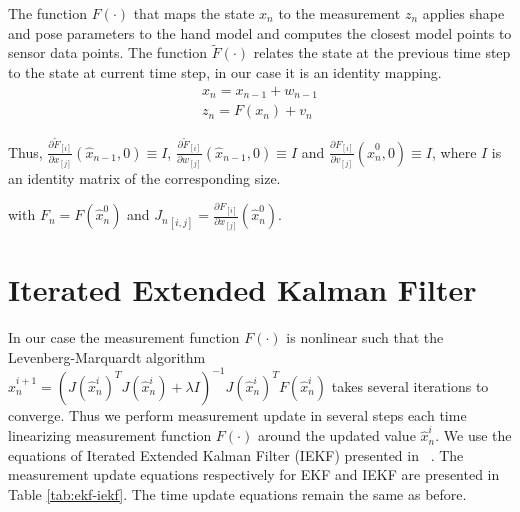 \documentclass[10pt,twocolumn,letterpaper]{article}
\begin{document}
The function $F(\cdot)$ that maps the state $x_n$ to the measurement $z_n$ applies shape and pose parameters to the hand model and computes the closest model points to sensor data points. 
The function $\tilde{F}(\cdot)$ relates the state at the previous time step to the state at current time step, in our case it is an identity mapping.
\begin{align}
x_n = x_{n - 1} + w_{n - 1} \\
z_n = F(x_n) + v_n 
\end{align}

Thus, $\frac{ \partial \tilde{F}_{[i]}}{ \partial x_{[j]}}(\hat{x}_{n - 1}, 0) \equiv I$, 
$\frac{ \partial \tilde{F}_{[i]}}{ \partial w_{[j]}}(\hat{x}_{n - 1}, 0) \equiv I$ and $\frac{ \partial F_{[i]}}{ \partial v_{[j]}}(\hat{x}_n^0, 0) \equiv I$, where $I$ is an identity matrix of the corresponding size.

\begin{table}[!h] 
\centering
\caption{Time and measurement update for EKF with $\tilde{F}(\cdot)$ being an identity mapping} 
\end{table}

with $F_n = F(\hat{x}_n^0)$ and ${J_n}_{[i, j]} = \frac{ \partial F_{[i]}}{ \partial x_{[j]}}(\hat{x}_n^0)$.

\section{Iterated Extended Kalman Filter}

In our case the measurement function $F(\cdot)$ is nonlinear such that the Levenberg-Marquardt algorithm
$\hat{x}_n^{i + 1} = (J(\hat{x}_n^i) ^T J(\hat{x}_n^i) + \lambda I)^{-1} J(\hat{x}_n^i)^T F(\hat{x}_n^i)$ takes several iterations to converge. Thus we perform measurement update in several steps each time linearizing measurement function  $F(\cdot)$ around the updated value $\hat{x}_n^i$. We use the equations of Iterated Extended Kalman Filter (IEKF) presented in ~\cite{havlik2015performance}. The measurement update equations respectively for EKF and IEKF are presented in Table \ref{tab:ekf-iekf}. The time update equations remain the same as before.
\end{document}
